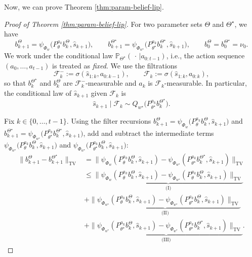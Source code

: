 \documentclass[10pt]{article} %
\theoremstyle{plain}
\theoremstyle{definition}
\theoremstyle{remark}
\newcommand{\bP}{\mathbb{P}}
\begin{document}
Now, we can prove Theorem \ref{thm:param-belief-lip}.

\begin{proof}[Proof of Theorem \ref{thm:param-belief-lip}]\label{proof-thm-belief}
For two parameter sets \(\Theta\) and \(\Theta^\star\), we have
\[
b_{k+1}^\Theta=\psi_{\Phi_w} \big(P_\theta^{a_k} b_k^\Theta,\hat s_{k+1}\big),\qquad
b_{k+1}^{\Theta^\star}=\psi_{\Phi_{w^\star}} \big(P_{\theta^\star}^{a_k} b_k^{\Theta^\star},\hat s_{k+1}\big),
\qquad b_0^\Theta=b_0^{\Theta^\star}=\nu_0.
\]
We work under the conditional law \(\bP_{\Theta^\star}(\,\cdot\,|a_{0:t-1})\), i.e., the action sequence \((a_0,\dots,a_{t-1})\) is treated as \emph{fixed}. We use the filtrations
\[
\mathcal F_k^- := \sigma(\hat s_{1:k},a_{0:k-1}),\qquad
\mathcal F_k := \sigma(\hat s_{1:k},a_{0:k}),
\]
so that \(b_k^{\Theta^\star}\) and \(b_k^\Theta\) are \(\mathcal F_k^-\)-measurable and \(a_k\) is \(\mathcal F_k\)-measurable. In particular, the conditional law of \(\hat s_{k+1}\) given \(\mathcal F_k\) is
\[
\hat s_{k+1}\mid \mathcal F_k \sim Q_{w^\star}\!\Big(P_{\theta^\star}^{a_k} b_k^{\Theta^\star}\Big).
\]

Fix \(k\in\{0,\dots,t-1\}\). Using the filter recursions
\(b_{k+1}^{\Theta}=\psi_{\Phi_w}\!\big(P_\theta^{a_k} b_k^{\Theta},\hat s_{k+1}\big)\) and
\(b_{k+1}^{\Theta^\star}=\psi_{\Phi_{w^\star}}\!\big(P_{\theta^\star}^{a_k} b_k^{\Theta^\star},\hat s_{k+1}\big)\),
add and subtract the intermediate terms
\(\psi_{\Phi_{w^\star}}\!\big(P_{\theta}^{a_k} b_k^{\Theta},\hat s_{k+1}\big)\) and
\(\psi_{\Phi_{w^\star}}\!\big(P_{\theta^\star}^{a_k} b_k^{\Theta},\hat s_{k+1}\big)\):
\begin{align} 
\|b_{k+1}^\Theta-b_{k+1}^{\Theta^\star}\|_{\mathrm{TV}}
&=\big\|\psi_{\Phi_w}(P_\theta^{a_k} b_k^\Theta,\hat s_{k+1}) -\psi_{\Phi_{w^\star}}(P_{\theta^\star}^{a_k} b_k^{\Theta^\star},\hat s_{k+1})\big\|_{\mathrm{TV}}\\[8pt]
&\le \underbrace{\big\|\psi_{\Phi_w}(P_\theta^{a_k} b_k^\Theta,\hat s_{k+1}) -\psi_{\Phi_{w^\star}}(P_\theta^{a_k} b_k^{\Theta},\hat s_{k+1})\big\|_{\mathrm{TV}}}_{\text{(I)}} \label{eq:belief-theorem-term-I}\\[2pt]
&+\underbrace{\big\|\psi_{\Phi_{w^\star}}(P_\theta^{a_k} b_k^{\Theta},\hat s_{k+1}) -\psi_{\Phi_{w^\star}}(P_{\theta^\star}^{a_k} b_k^{\Theta},\hat s_{k+1})\big\|_{\mathrm{TV}}}_{\text{(II)}} \label{eq:belief-theorem-term-II}\\[2pt]
&+\underbrace{\big\|\psi_{\Phi_{w^\star}}(P_{\theta^\star}^{a_k} b_k^{\Theta},\hat s_{k+1}) -\psi_{\Phi_{w^\star}}(P_{\theta^\star}^{a_k} b_k^{\Theta^\star},\hat s_{k+1})\big\|_{\mathrm{TV}}}_{\text{(III)}}. \label{eq:belief-theorem-term-III}
\end{align}


\end{proof}
\end{document}

